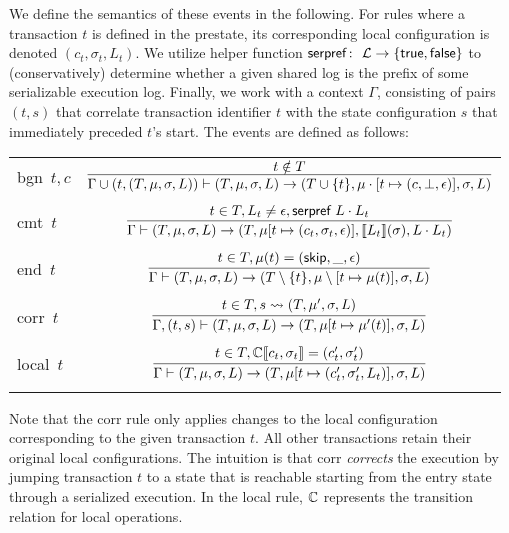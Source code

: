 We define the semantics of these events in the following. For rules where a transaction $t$ is defined in the prestate, its corresponding local configuration is denoted $(c_t,\sigma_t,L_t)$. We utilize
helper function ${\sf serpref} \colon\ {\cal L} \rightarrow \{ {\sf true},{\sf false} \}$ to (conservatively) determine whether a given shared log is the prefix of some serializable execution log. Finally, we work with a context $\Gamma$, consisting of pairs $(t,s)$ that correlate
transaction identifier $t$ with the state configuration $s$
that immediately preceded $t$'s start.
%
The events are defined as follows:
\begin{center}
\begin{tabular}{lc}
\\
{\sf bgn}\ $t,c$ & $\infer{\Gamma\cup(t,(T,\mu,\sigma,L))\vdash(T, \mu, \sigma, L) \rightarrow (T \cup \{ t \}, \mu \cdot [t \mapsto (c,\bot,\epsilon)], \sigma, L)}{t \notin T}$ \\
\\
{\sf cmt}\ $t$ & $\infer{\Gamma\vdash(T, \mu, \sigma, L) \rightarrow (T, \mu[t \mapsto (c_t,\sigma_t,\epsilon)], \llbracket L_t \rrbracket(\sigma), L \cdot L_t)}{t \in T, L_t \neq \epsilon, {\textnormal{\sf serpref}\ L \cdot L_t}}$ \\
\\
{\sf end}\ $t$ & $\infer{\Gamma\vdash(T, \mu, \sigma, L) \rightarrow (T \setminus \{ t \}, \mu \setminus [t \mapsto \mu(t)], \sigma, L)}{t \in T, \mu(t) = ({\sf skip}, \_, \epsilon)}$ \\
\\
{\sf corr}\ $t$ & $\infer{\Gamma,(t,s)\vdash(T, \mu, \sigma, L) \rightarrow (T,\mu[t \mapsto \mu'(t)], \sigma, L)}{
	t \in T, 
	s \leadsto (T,\mu', \sigma, L)}$\\
\\
{\sf local}\ $t$ & $\infer{\Gamma\vdash(T, \mu, \sigma, L) \rightarrow (T,\mu[t \mapsto (c'_t,\sigma'_t,L_t)], \sigma, L)}
{t \in T, \csemantics{C}{c_t, \sigma_t} = (c'_t, \sigma'_t)}$\\
\\
\end{tabular}
\end{center}
Note that the {\sf corr} rule only applies changes to the local configuration corresponding to the given transaction $t$. All other transactions retain their original local configurations. The intuition is that {\sf corr} \emph{corrects} the execution by jumping transaction $t$ to a state that is reachable starting from the entry state through a serialized execution.
In the {\sf local} rule, $\mathbb{C}$ represents the transition relation for local operations. 

